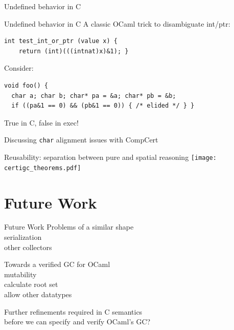\documentclass[usenames, xcolor=dvipsnames]{beamer}
\begin{document}
{\begin{frame}[fragile]{Undefined behavior in C}
    \end{frame}

\begin{frame}[fragile]{Undefined behavior in C}  
A classic OCaml trick to disambiguate int/ptr:
    \begin{Verbatim}
int test_int_or_ptr (value x) {
    return (int)(((intnat)x)&1); }
    \end{Verbatim}

\pause \pause

\bigskip

Consider:
\begin{Verbatim}
void foo() {
  char a; char b; char* pa = &a; char* pb = &b;
  if ((pa&1 == 0) && (pb&1 == 0)) { /* elided */ } }
\end{Verbatim}

\pause
True in C, false in exec!

\bigskip

\pause Discussing \texttt{char} alignment issues with CompCert
\end{frame}



\begin{frame}{Reusability: separation between pure and spatial reasoning}
  \centering
  \texttt{[image: certigc\_theorems.pdf]}
\end{frame}

\section{Future Work}
\begin{frame}{Future Work}
  Problems of a \alert{similar shape} \\
  \pause 
  \hspace{1em}serialization \\ 
  \hspace{1em}other collectors

  \bigskip

  \pause
  Towards a verified GC for \alert{OCaml} \\
  \pause 
  \hspace{1em}mutability \\ 
  \hspace{1em}calculate root set \\ 
  \hspace{1em}allow other datatypes

  \bigskip
  \pause \alert{Further refinements} required in C semantics \\ 
  \hspace{1em}before we can \alert{specify} and \alert{verify} OCaml's GC?
  \end{frame}

}
\end{document}
